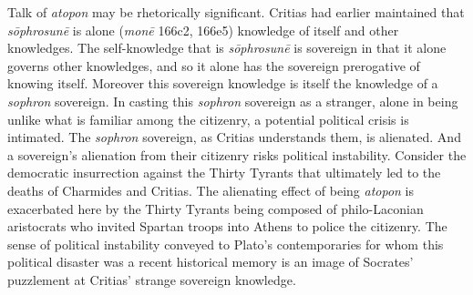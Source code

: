 Talk of \emph{atopon} may be rhetorically significant. Critias had earlier maintained that \emph{sōphrosunē} is alone (\emph{monē} 166c2, 166e5) knowledge of itself and other knowledges. The self-knowledge that is \emph{sōphrosunē} is sovereign in that it alone governs other knowledges, and so it alone has the sovereign prerogative of knowing itself. Moreover this sovereign knowledge is itself the knowledge of a \emph{sophron} sovereign. In casting this \emph{sophron} sovereign as a stranger, alone in being unlike what is familiar among the citizenry, a potential political crisis is intimated. The \emph{sophron} sovereign, as Critias understands them, is alienated. And a sovereign's alienation from their citizenry risks political instability. Consider the democratic insurrection against the Thirty Tyrants that ultimately led to the deaths of Charmides and Critias. The alienating effect of being \emph{atopon} is exacerbated here by the Thirty Tyrants being composed of philo-Laconian aristocrats who invited Spartan troops into Athens to police the citizenry. The sense of political instability conveyed to Plato's contemporaries for whom this political disaster was a recent historical memory is an image of Socrates' puzzlement at Critias' strange sovereign knowledge.

